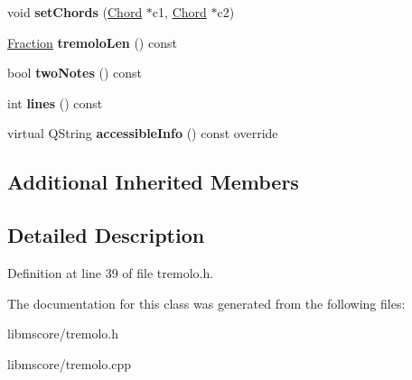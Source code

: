 \begin{DoxyCompactItemize}
void {\bfseries set\+Chords} (\hyperlink{class_ms_1_1_chord}{Chord} $\ast$c1, \hyperlink{class_ms_1_1_chord}{Chord} $\ast$c2)
\item 
\mbox{\label{class_ms_1_1_tremolo_a66a87c735d11405748d87de87bb2567b}} 
\hyperlink{class_ms_1_1_fraction}{Fraction} {\bfseries tremolo\+Len} () const
\item 
\mbox{\label{class_ms_1_1_tremolo_a7e98943cb86fb69bc5e59024f3d880fd}} 
bool {\bfseries two\+Notes} () const
\item 
\mbox{\label{class_ms_1_1_tremolo_a3c2a1a737f7fb1fa190291b63ce118f4}} 
int {\bfseries lines} () const
\item 
\mbox{\label{class_ms_1_1_tremolo_a204ef3abe20da6c210f915faa9299526}} 
virtual Q\+String {\bfseries accessible\+Info} () const override
\end{DoxyCompactItemize}
\subsection*{Additional Inherited Members}


\subsection{Detailed Description}


Definition at line 39 of file tremolo.\+h.



The documentation for this class was generated from the following files\+:\begin{DoxyCompactItemize}
\item 
libmscore/tremolo.\+h\item 
libmscore/tremolo.\+cpp\end{DoxyCompactItemize}
